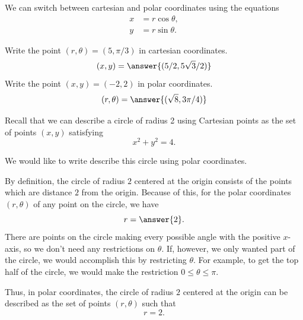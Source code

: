 \documentclass{ximera}
\begin{document}
We can switch between cartesian and polar coordinates using the equations
\begin{align*}
x&=r\cos\theta,\\
y&=r\sin\theta.
\end{align*}

\begin{image}
\end{image}

\begin{problem}
Write the point $(r,\theta) = (5, \pi/3)$ in cartesian coordinates.
\[
(x,y) = \answer{(5/2, 5\sqrt{3}/2)}
\]
Write the point $(x,y) = (-2,2)$ in polar coordinates.
\[
(r,\theta) = \answer{(\sqrt{8}, 3\pi/4)}
\]
\end{problem}

\begin{example}
Recall that we can describe a circle of radius 2 using Cartesian points as the set of points $(x,y)$ satisfying
\[
x^2+y^2 = 4.
\]

\begin{image}
\end{image}

We would like to write describe this circle using polar coordinates.

By definition, the circle of radius $2$ centered at the origin consists of the points which are distance $2$ from the origin. Because of this, for the polar coordinates $(r,\theta)$ of any point on the circle, we have
\[
r = \answer{2}.
\]
There are points on the circle making every possible angle with the positive $x$-axis, so we don't need any restrictions on $\theta$. If, however, we only wanted part of the circle, we would accomplish this by restricting $\theta$. For example, to get the top half of the circle, we would make the restriction $0\leq \theta \leq \pi$.

Thus, in polar coordinates, the circle of radius $2$ centered at the origin can be described as the set of points $(r,\theta)$ such that
\[
r = 2.
\]
\end{example}
\end{document}
